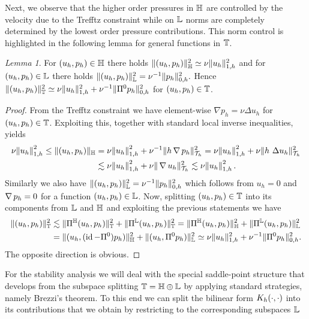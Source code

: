 \documentclass[pdflatex,sn-mathphys,Numbered]{sn-jnl}%
\theoremstyle{remark}%
\newtheorem{lemma}[theorem]{Lemma}
\theoremstyle{definition}%
\begin{document}
Next, we observe that the higher order pressures in $\mathbb{H}$ are controlled by the velocity
due to the Trefftz constraint while on $\mathbb{L}$ norms are completely determined by
the lowest order pressure contributions. 
This norm control is highlighted in the following lemma for general functions in $\mathbb{T}$.
\begin{lemma}\label{lem:normeq}
  For $(u_h,p_h) \in \mathbb{H}$ there holds
  $
  \Vert (u_h,p_h) \Vert_{\mathbb{H}}^2 \simeq \nu \Vert u_h \Vert_{1,h}^2
  $
  and for $(u_h,p_h) \in \mathbb{L}$ there holds
  $
  \Vert (u_h,p_h) \Vert_{\mathbb{L}}^2 = \nu^{-1} \Vert p_h \Vert_{0,h}^2. 
  $
  Hence $\Vert (u_h,p_h) \Vert_{\mathbb{T}}^2 \simeq \nu \Vert u_h \Vert_{1,h}^2 + \nu^{-1} \Vert \Pi^0 p_h \Vert_{0,h}^2$
  for $(u_h,p_h) \in \mathbb{T}$. 
\end{lemma}
\begin{proof}
  From the Trefftz constraint we have element-wise $\nabla p_h = \nu
  \Delta u_h$ for $(u_h,p_h) \in \mathbb{T}$. Exploiting this, together with
  standard local inverse inequalities, yields
  \begin{align*}
    \nu \norm{u_h}_{1,h}^2 \leq \Vert (u_h,p_h) \Vert_{\mathbb{H}} & = \nu \norm{u_h}_{1,h}^2 + \nu^{-1} \Vert h \operatorname{\nabla} p_h \Vert_{{\mathcal{T}_h}}^2 = \nu \norm{u_h}_{1,h}^2 + \nu \Vert h \ \Delta u_h \Vert_{{\mathcal{T}_h}}^2 \\
    & \lesssim \nu \norm{u_h}_{1,h}^2 +  \nu \Vert \operatorname{\nabla} u_h \Vert_{{\mathcal{T}_h}}^2 \lesssim \nu \norm{u_h}_{1,h}^2. 
  \end{align*}
  Similarly we also have $\Vert (u_h,p_h) \Vert_{\mathbb{L}}^2 = \nu^{-1} \Vert p_h \Vert_{0,h}^2$ which follows from
  $u_h=0$ and $\operatorname{\nabla} p_h = 0$ for a function $(u_h,p_h) \in \mathbb{L}$. Now, splitting $(u_h,p_h) \in \mathbb{T}$ into its components from
  $\mathbb{L}$  and $\mathbb{H}$ and exploiting the previous statements we have
  \begin{align*}
    \Vert (u_h,p_h) \Vert_{\mathbb{T}}^2
    & \lesssim \Vert \Pi^{\mathbb{H}}(u_h,p_h) \Vert_{\mathbb{T}}^2 +   \Vert \Pi^{\mathbb{L}}(u_h,p_h) \Vert_{\mathbb{T}}^2
    = \Vert \Pi^{\mathbb{H}}(u_h,p_h) \Vert_{\mathbb{H}}^2 +   \Vert \Pi^{\mathbb{L}}(u_h,p_h) \Vert_{\mathbb{L}}^2 \\
    & = \Vert (u_h,(\operatorname{id} - \Pi^0)p_h) \Vert_{\mathbb{H}}^2 + \Vert (u_h, \Pi^0 p_h) \Vert_{\mathbb{L}}^2
    \simeq \nu \Vert u_h \Vert_{1,h}^2 + \nu^{-1} \Vert \Pi^0 p_h \Vert_{0,h}^2.
  \end{align*}
  The opposite direction is obvious.
\end{proof}
For the stability analysis we will deal with the special saddle-point structure 
that develops from the subspace splitting $\mathbb{T} = \mathbb{H} \oplus \mathbb{L}$ by applying standard strategies, namely Brezzi's theorem.
To this end we can split the bilinear form $K_h(\cdot,\cdot)$ into its
contributions that we obtain by restricting to the corresponding subspaces $\mathbb{L}$
\end{document}
